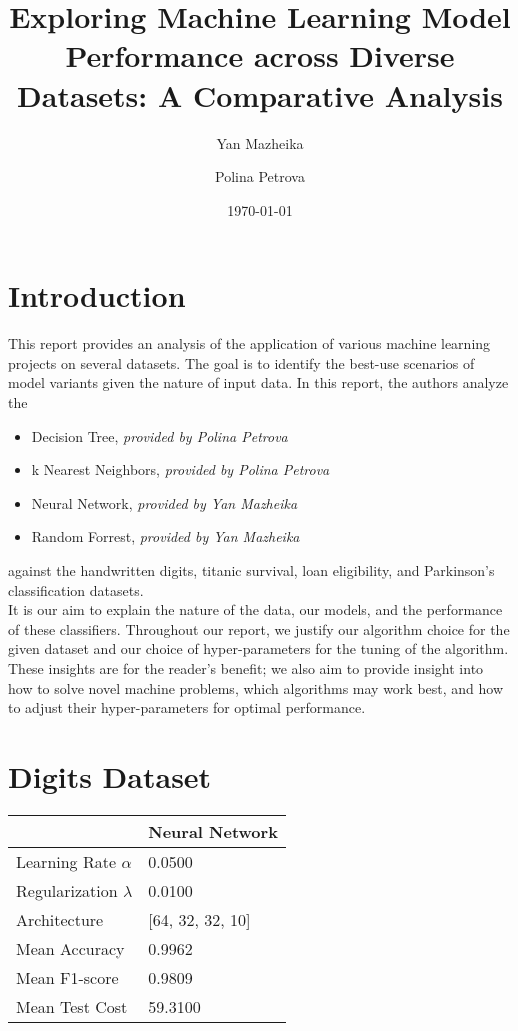 \documentclass{article}
\title{Exploring Machine Learning Model Performance across Diverse Datasets: A Comparative Analysis}
\author{Yan Mazheika \and Polina Petrova}
\date{\today}
\begin{document}
\maketitle

\section*{Introduction}
This report provides an analysis of the application of various machine learning projects on several datasets.
The goal is to identify the best-use scenarios of model variants given the nature of input data.
In this report, the authors analyze the
\begin{itemize}
    \item Decision Tree, \textit{provided by Polina Petrova}
    \item k Nearest Neighbors, \textit{provided by Polina Petrova}
    \item Neural Network, \textit{provided by Yan Mazheika}
    \item Random Forrest, \textit{provided by Yan Mazheika}
\end{itemize}
against the handwritten digits, titanic survival, loan eligibility, and Parkinson's classification datasets.
\\

It is our aim to explain the nature of the data, our models, and the performance of these classifiers. Throughout our report,
we justify our algorithm choice for the given dataset and our choice of hyper-parameters for the tuning of the algorithm. These insights
are for the reader's benefit; we also aim to provide insight into how to solve novel machine problems, which algorithms may work best, and how
to adjust their hyper-parameters for optimal performance.


\newpage
\section*{Digits Dataset}

\begin{tabular}{ll}
    \toprule
     & Neural Network \\
    \midrule
    Learning Rate $\alpha$ & 0.0500 \\
    Regularization $\lambda$ & 0.0100 \\
    Architecture & [64, 32, 32, 10] \\
    Mean Accuracy & 0.9962 \\
    Mean F1-score & 0.9809 \\
    Mean Test Cost & 59.3100 \\
    \bottomrule
\end{tabular}
\end{document}
